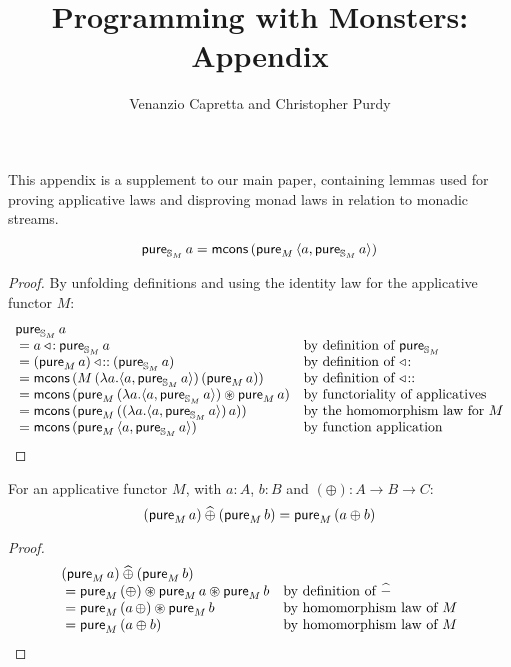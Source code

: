 \documentclass{article}
\title{Programming with Monsters: Appendix}
\author{Venanzio Capretta and Christopher Purdy}
\newenvironment{lemma}[1]{%
  \renewcommand\thelemmainner{#1}%
  \lemmainner
}{\endlemmainner}
\begin{document}


\maketitle

This appendix is a supplement to our main paper, containing lemmas used for proving applicative laws and disproving monad laws in relation to monadic streams. 

\begin{lemma}{5}\label{lemma:monster_pure}
$$
\mathsf{pure}_{\mathbb{S}_{M}}\,a = \mathsf{mcons}\,(\mathsf{pure}_M\,\langle a, \mathsf{pure}_{\mathbb{S}_{M}}\,a\rangle)
$$
\end{lemma}
\begin{proof}
By unfolding definitions and using the identity law for the applicative functor $M$:
$$
\begin{array}{ll}
\mathsf{pure}_{\mathbb{S}_{M}}\,a \\
{}= a \mathbin{\triangleleft\!:} \mathsf{pure}_{\mathbb{S}_{M}}\,a
  & \mbox{by definition of }\mathsf{pure}_{\mathbb{S}_{M}} \\
{}= (\mathsf{pure}_M\,a) \mathbin{\triangleleft\!::} (\mathsf{pure}_{\mathbb{S}_{M}}\,a)
  & \mbox{by definition of }\mathbin{\triangleleft\!:}\\
{}=  \mathsf{mcons}\, (M\,(\lambda a. \langle a, \mathsf{pure}_{\mathbb{S}_{M}}\,a\rangle)\,(\mathsf{pure}_M\,a))
  & \mbox{by definition of }\mathbin{\triangleleft\!::}\\
{}= \mathsf{mcons}\, (\mathsf{pure}_M\,(\lambda a. \langle a, \mathsf{pure}_{\mathbb{S}_{M}}\,a\rangle) \circledast \mathsf{pure}_M\,a)
  & \mbox{by functoriality of applicatives}\\
{}= \mathsf{mcons}\, (\mathsf{pure}_M\,((\lambda a. \langle a, \mathsf{pure}_{\mathbb{S}_{M}}\,a\rangle)\,a))
  & \mbox{by the homomorphism law for }M\\
{}= \mathsf{mcons}\, (\mathsf{pure}_M\,\langle a, \mathsf{pure}_{\mathbb{S}_{M}}\,a\rangle)
  & \mbox{by function application}
\end{array}
$$
\end{proof}


\begin{lemma}{10}\label{lemma:pure_lift}
For an applicative functor $M$, with $a:A$, $b:B$ and $(\oplus) : A \rightarrow B \rightarrow C$:
$$
(\mathsf{pure}_M\, a) \mathbin{\widehat{\oplus}} (\mathsf{pure}_M\, b) = \mathsf{pure}_M\, (a \oplus b)
$$
\end{lemma}
\begin{proof}
$$
\begin{array}{ll}
(\mathsf{pure}_M\, a) \mathbin{\widehat{\oplus}} (\mathsf{pure}_M\, b) \\
{}= \mathsf{pure}_M\, (\oplus) \circledast \mathsf{pure}_M\, a \circledast \mathsf{pure}_M\, b
  & \mbox{by definition of }\mathbin{\widehat{-}}\\
{}= \mathsf{pure}_M\, (a\, \oplus) \circledast \mathsf{pure}_M\, b
  & \mbox{by homomorphism law of }M\\
{}= \mathsf{pure}_M\, (a \oplus b)
  & \mbox{by homomorphism law of }M\\
\end{array}
$$
\end{proof}
\end{document}
